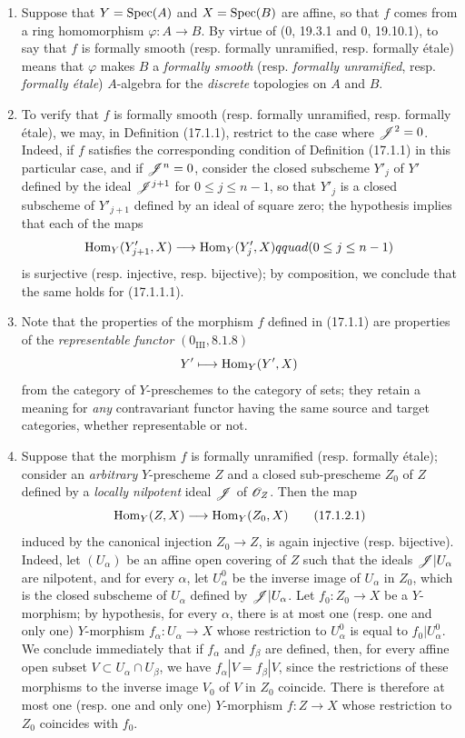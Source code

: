 \begin{remarks}[17.1.2]
\label{IV.17.1.2}
\begin{enumerate}
  \item[(i)] Suppose that $Y=\operatorname{Spec}(A)$ and $X=\operatorname{Spec}(B)$ are affine, so that $f$ comes from a ring homomorphism $\varphi:A\to B$. By virtue of (0, 19.3.1 and 0, 19.10.1), to say that $f$ is formally smooth (resp. formally unramified, resp. formally étale) means that $\varphi$ makes $B$ a \emph{formally smooth} (resp. \emph{formally unramified}, resp. \emph{formally étale}) $A$-algebra for the \emph{discrete} topologies on $A$ and $B$.
  \item[(ii)] To verify that $f$ is formally smooth (resp. formally unramified, resp. formally étale), we may, in Definition (17.1.1), restrict to the case where $\mathscr{J}^2=0$. Indeed, if $f$ satisfies the corresponding condition of Definition (17.1.1) in this particular case, and if $\mathscr{J}^n=0$, consider the closed subscheme $Y'_j$ of $Y'$ defined by the ideal $\mathscr{J}^{j+1}$ for $0\leq j\leq n-1$, so that $Y'_j$ is a closed subscheme of $Y'_{j+1}$ defined by an ideal of square zero; the hypothesis implies that each of the maps
  \[
    \operatorname{Hom}_Y(Y'_{j+1},X)\longrightarrow\operatorname{Hom}_Y(Y'_j,X)qquad(0\leq j\leq n-1)
  \]
  is surjective (resp. injective, resp. bijective); by composition, we conclude that the same holds for (17.1.1.1).
  \item[(iii)] Note that the properties of the morphism $f$ defined in (17.1.1) are properties of the \emph{representable functor} $(0_{\mathrm{III}}, 8.1.8)$
  \[
    Y'\longmapsto\operatorname{Hom}_Y(Y',X)
  \]
  from the category of $Y$-preschemes to the category of sets; they retain a meaning for \emph{any} contravariant functor having the same source and target categories, whether representable or not.
  \item[(iv)] Suppose that the morphism $f$ is formally unramified (resp. formally étale); consider an \emph{arbitrary} $Y$-prescheme $Z$ and a closed sub-prescheme $Z_0$ of $Z$ defined by a \emph{locally nilpotent} ideal $\mathscr{J}$ of $\mathscr{O}_Z$. Then the map
  \[
  \label{IV.17.1.2.1}
    \operatorname{Hom}_Y(Z,X)\longrightarrow\operatorname{Hom}_Y(Z_0,X)
    \tag{17.1.2.1}
  \]
  induced by the canonical injection $Z_0\to Z$, is again injective (resp. bijective). Indeed, let $(U_\alpha)$ be an affine open covering of $Z$ such that the ideals $\mathscr{J}|U_\alpha$ are nilpotent, and for every $\alpha$, let $U^0_\alpha$ be the inverse image of $U_\alpha$ in $Z_0$, which is the closed subscheme of $U_\alpha$ defined by $\mathscr{J}|U_\alpha$. Let $f_0:Z_0\to X$ be a $Y$-morphism; by hypothesis, for every $\alpha$, there is at most one (resp. one and only one) $Y$-morphism $f_\alpha:U_\alpha\to X$ whose restriction to $U^0_\alpha$ is equal to $f_0|U^0_\alpha$. We conclude immediately that if $f_\alpha$ and $f_\beta$ are defined, then, for every affine open subset $V\subset U_\alpha\cap U_\beta$, we have $f_\alpha|V=f_\beta|V$, since the restrictions of these morphisms to the inverse image $V_0$ of $V$ in $Z_0$ coincide. There is therefore at most one (resp. one and only one) $Y$-morphism $f:Z\to X$ whose restriction to $Z_0$ coincides with $f_0$.
\end{enumerate}
\end{remarks}

